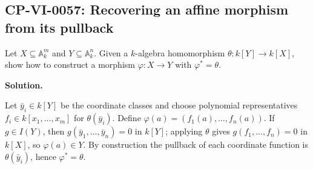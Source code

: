 
\subsection*{CP-VI-0057: Recovering an affine morphism from its pullback}

Let $X\subseteq\mathbb A_k^m$ and $Y\subseteq\mathbb A_k^n$. Given a $k$-algebra homomorphism $\theta:k[Y]\to k[X]$, show how to construct a morphism $\varphi:X\to Y$ with $\varphi^*=\theta$.

\medskip
\noindent\textbf{Solution.}

Let $\bar y_i\in k[Y]$ be the coordinate classes and choose polynomial representatives $f_i\in k[x_1,\dots,x_m]$ for $\theta(\bar y_i)$. Define $\varphi(a)=(f_1(a),\dots,f_n(a))$. If $g\in I(Y)$, then $g(\bar y_1,\dots,\bar y_n)=0$ in $k[Y]$; applying $\theta$ gives $g(f_1,\dots,f_n)=0$ in $k[X]$, so $\varphi(a)\in Y$. By construction the pullback of each coordinate function is $\theta(\bar y_i)$, hence $\varphi^*=\theta$.
